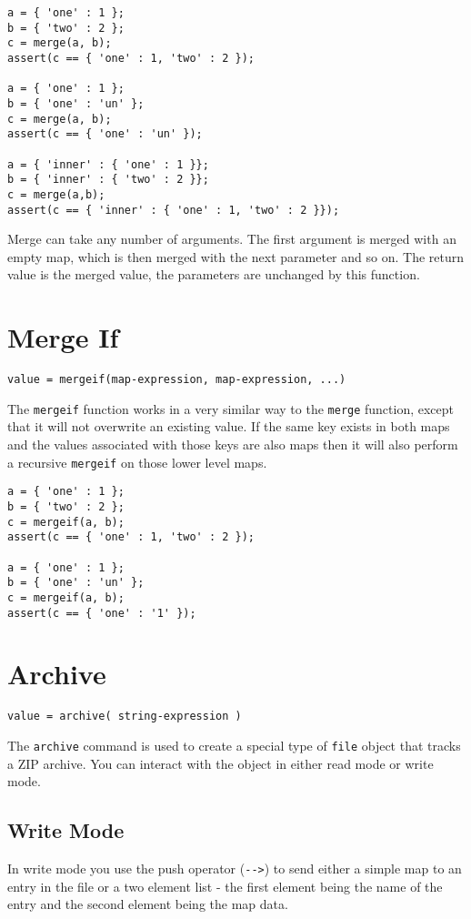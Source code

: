 \begin{lstlisting}[caption={Merge example}]
a = { 'one' : 1 };
b = { 'two' : 2 };
c = merge(a, b);
assert(c == { 'one' : 1, 'two' : 2 });

a = { 'one' : 1 };
b = { 'one' : 'un' };
c = merge(a, b);
assert(c == { 'one' : 'un' });

a = { 'inner' : { 'one' : 1 }};
b = { 'inner' : { 'two' : 2 }};
c = merge(a,b);
assert(c == { 'inner' : { 'one' : 1, 'two' : 2 }});

\end{lstlisting}

Merge can take any number of arguments. The first argument is merged with an empty map, which is then merged with the next parameter and so on. The return value is the merged value, the parameters are unchanged by this function.

\section{Merge If}
\begin{Verbatim}
value = mergeif(map-expression, map-expression, ...)
\end{Verbatim}

The \Verb+mergeif+ function works in a very similar way to the \verb+merge+ function, except that it will not overwrite an existing value. If the same key exists in both maps and the values associated with those keys are also maps then it will also perform a recursive \verb+mergeif+ on those lower level maps.

\begin{lstlisting}[caption={Merge If example}]
a = { 'one' : 1 };
b = { 'two' : 2 };
c = mergeif(a, b);
assert(c == { 'one' : 1, 'two' : 2 });

a = { 'one' : 1 };
b = { 'one' : 'un' };
c = mergeif(a, b);
assert(c == { 'one' : '1' });
\end{lstlisting}

\section{Archive}
\begin{Verbatim}
value = archive( string-expression )
\end{Verbatim}
The \Verb+archive+ command is used to create a special type of \verb+file+ object that tracks a ZIP archive. You can interact with the object in either read mode or write mode.
\subsection{Write Mode}
In write mode you use the push operator (\Verb+-->+) to send either a simple map to an entry in the file or a two element list - the first element being the name of the entry and the second element being the map data.

